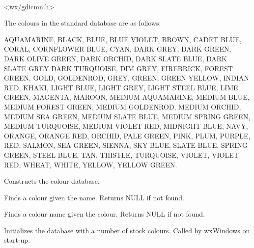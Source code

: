 
\\


<wx/gdicmn.h>


The colours in the standard database are as follows:

AQUAMARINE, BLACK, BLUE, BLUE VIOLET, BROWN, CADET BLUE, CORAL,
CORNFLOWER BLUE, CYAN, DARK GREY, DARK GREEN, DARK OLIVE GREEN, DARK
ORCHID, DARK SLATE BLUE, DARK SLATE GREY DARK TURQUOISE, DIM GREY,
FIREBRICK, FOREST GREEN, GOLD, GOLDENROD, GREY, GREEN, GREEN YELLOW,
INDIAN RED, KHAKI, LIGHT BLUE, LIGHT GREY, LIGHT STEEL BLUE, LIME GREEN,
MAGENTA, MAROON, MEDIUM AQUAMARINE, MEDIUM BLUE, MEDIUM FOREST GREEN,
MEDIUM GOLDENROD, MEDIUM ORCHID, MEDIUM SEA GREEN, MEDIUM SLATE BLUE,
MEDIUM SPRING GREEN, MEDIUM TURQUOISE, MEDIUM VIOLET RED, MIDNIGHT BLUE,
NAVY, ORANGE, ORANGE RED, ORCHID, PALE GREEN, PINK, PLUM, PURPLE, RED,
SALMON, SEA GREEN, SIENNA, SKY BLUE, SLATE BLUE, SPRING GREEN, STEEL
BLUE, TAN, THISTLE, TURQUOISE, VIOLET, VIOLET RED, WHEAT, WHITE, YELLOW,
YELLOW GREEN.




\label{wxcolourdatabaseconstr}


Constructs the colour database.

\label{wxcolourdatabasefindcolour}


Finds a colour given the name. Returns NULL if not found.

\label{wxcolourdatabasefindname}


Finds a colour name given the colour. Returns NULL if not found.

\label{wxcolourdatabaseinitialize}


Initializes the database with a number of stock colours.  Called by wxWindows
on start-up.


